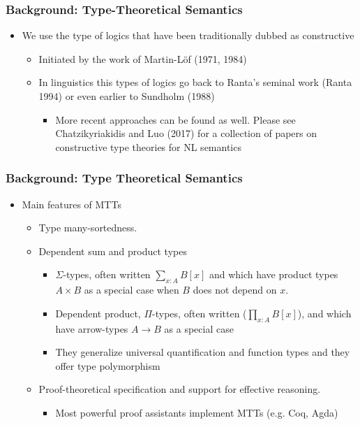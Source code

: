 \documentclass[11pt]{beamer}
\begin{document}
\begin{frame}
  \frametitle{Background: Type-Theoretical Semantics}
  
  \begin{itemize}
  \item We use the type of logics that have been traditionally dubbed as constructive
    \begin{itemize}
    \item Initiated by the work of Martin-L\"of (1971, 1984)
    \item In linguistics this types of logics go back to Ranta's seminal work (Ranta 1994) or even earlier to Sundholm (1988)
      \begin{itemize}
      \item More recent approaches can be found as well. Please see
        Chatzikyriakidis and Luo (2017) for a collection of papers on
        constructive type theories for NL semantics
      \end{itemize}\end{itemize}\end{itemize}
\end{frame}


\begin{frame}
  \frametitle{Background: Type Theoretical Semantics}
  \begin{itemize}
  \item Main features of MTTs
    \begin{itemize}
    \item  Type many-sortedness.
    \item Dependent sum and product types
      \begin{itemize}
      \item $\Sigma$-types, often written $\sum_{x:A}B[x]$ and which
        have product types $A\times B$ as a special case when $B$ does
        not depend on $x$.
      \item Dependent product, $\Pi$-types, often written
        ($\prod_{x:A}B[x]$), and which have arrow-types $A\to B$ as a
        special case
      \item They generalize universal quantification and function
        types and they offer type polymorphism
      \end{itemize}
    \item Proof-theoretical specification and support for effective
      reasoning.
      \begin{itemize}
      \item Most powerful proof assistants implement MTTs (e.g. Coq, Agda)
      \end{itemize}\end{itemize}\end{itemize}
\end{frame}
\end{document}
